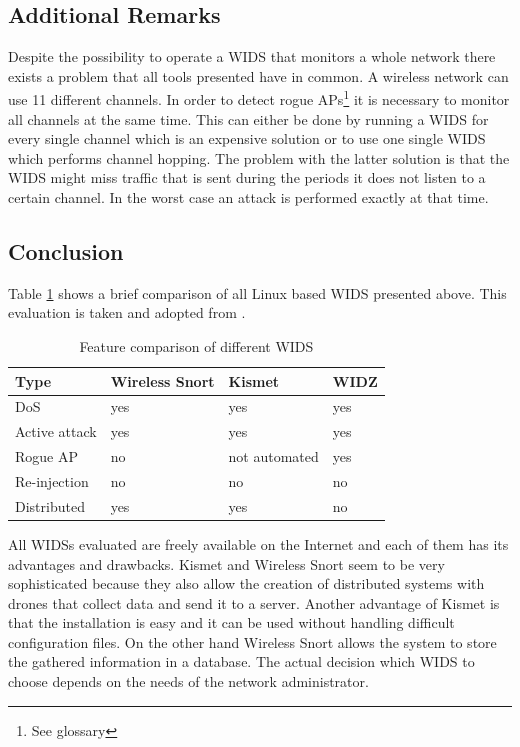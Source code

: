 \subsection*{Additional Remarks}

Despite the possibility to operate a WIDS that monitors a whole network there exists a problem that all tools presented have in common. A wireless network can use 11 different channels. In order to detect rogue APs\footnote{See glossary} it is necessary to monitor all channels at the same time. This can either be done by running a WIDS for every single channel which is an expensive solution or to use one single WIDS which performs channel hopping. The problem with the latter solution is that the WIDS might miss traffic that is sent during the periods it does not listen to a certain channel. In the worst case an attack is performed exactly at that time.

\subsection*{Conclusion}

Table \ref{wids_compare} shows a brief comparison of all Linux based WIDS presented above. This evaluation is taken and adopted from \cite{wlan_sicherheit}.

\begin{table}[htbp]
	\vspace{1.5em}
	\begin{center}
		\begin{tabular}{|p{80pt}|p{80pt}|p{80pt}|p{80pt}|}
		\hline
		\bf{Type}&\bf{Wireless Snort}&\bf{Kismet}&\bf{WIDZ}\\
		\hline
		DoS&yes&yes&yes\\
		\hline
		Active attack&yes&yes&yes\\
		\hline
		Rogue AP&no&not automated&yes\\
		\hline
		Re-injection&no&no&no\\
		\hline
		Distributed&yes&yes&no\\
		\hline
		\end{tabular}
	\end{center}
	\vspace{-1em}
	\caption{Feature comparison of different WIDS}
	\vspace{1.5em}
	\label{wids_compare}
\end{table}

All WIDSs evaluated are freely available on the Internet and each of them has its advantages and drawbacks. Kismet and Wireless Snort seem to be very sophisticated because they also allow the creation of distributed systems with drones that collect data and send it to a server. Another advantage of Kismet is that the installation is easy and it can be used without handling difficult configuration files. On the other hand Wireless Snort allows the system to store the gathered information in a database. The actual decision which WIDS to choose  depends on the needs of the network administrator.
